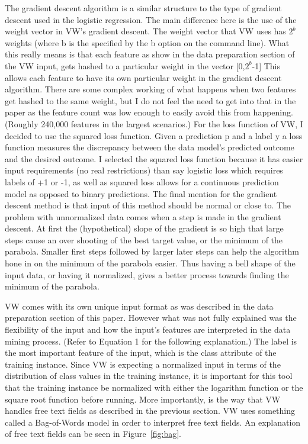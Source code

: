 \documentclass[conference]{IEEEtran}
\begin{document}
The gradient descent algorithm is a similar structure to the type of gradient
descent used in the logistic regression. 
The main difference here is the use of the weight vector in VW’s
gradient descent. The weight vector that VW uses has $2^b$ weights (where b is
the specified by the b option on the command line). What this really means is
that each feature as show in the data preparation section of the VW input, gets
hashed to a particular weight in the vector [0,$2^b$-1] This allows each feature
to have its own particular weight in the gradient descent algorithm. There are
some complex working of what happens when two features get hashed to the
same weight, but I do not feel the need to get into that in the paper as the
feature count was low enough to easily avoid this from happening. (Roughly 
240,000 features in the largest scenarios.) For the loss function of VW,
I decided to use the squared loss function. Given a prediction p and a label
y a loss function measures the discrepancy between the data model’s predicted
outcome and the desired outcome. I selected the squared loss function because 
it has easier input requirements (no real restrictions) than say logistic loss
which requires labels of +1 or -1, as well as squared loss allows for a continuous
prediction model as opposed to binary predictions. The final mention for the
gradient descent method is that input of this method should be normal or close
to. The problem with unnormalized data comes when a step is made in the
gradient descent. At first the (hypothetical) slope of the gradient is so high
that large steps cause an over shooting of the best target value, or the minimum 
of the parabola. Smaller first steps followed by larger later steps can help
the algorithm hone in on the minimum of the parabola easier. Thus having a
bell shape of the input data, or having it normalized, gives a better process
towards finding the minimum of the parabola.

VW comes with its own unique input format as was described in the data
preparation section of this paper. However what was not fully explained was
the flexibility of the input and how the input’s features are interpreted in the
data mining process. (Refer to Equation 1 for the following explanation.) The
label is the most important feature of the input, which is the class attribute of
the training instance. Since VW is expecting a normalized input in terms of
the distribution of class values in the training instance, it is important for this
tool that the training instance be normalized with either the logarithm function
or the square root function before running. More importantly, is the way that
VW handles free text fields as described in the previous section. VW uses
something called a Bag-of-Words model in order to interpret free text fields. An
explanation of free text fields can be seen in Figure~\ref{fig:bag}.
\end{document}
